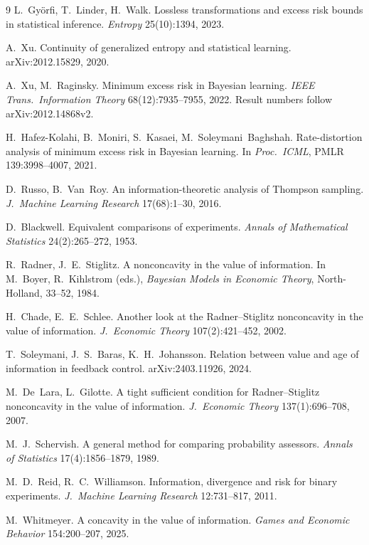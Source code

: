 \documentclass[11pt]{article}
\begin{document}
\begin{thebibliography}{9}
L.~Gy\"orfi, T.~Linder, H.~Walk. Lossless transformations and excess
risk bounds in statistical inference. \emph{Entropy} 25(10):1394, 2023.

A.~Xu. Continuity of generalized entropy and statistical learning.
arXiv:2012.15829, 2020.

A.~Xu, M.~Raginsky. Minimum excess risk in Bayesian learning.
\emph{IEEE Trans.\ Information Theory} 68(12):7935--7955, 2022.
Result numbers follow arXiv:2012.14868v2.

H.~Hafez-Kolahi, B.~Moniri, S.~Kasaei, M.~Soleymani~Baghshah.
Rate-distortion analysis of minimum excess risk in Bayesian learning.
In \emph{Proc.\ ICML}, PMLR 139:3998--4007, 2021.

D.~Russo, B.~Van~Roy. An information-theoretic analysis of Thompson
sampling. \emph{J.\ Machine Learning Research} 17(68):1--30, 2016.

D.~Blackwell. Equivalent comparisons of experiments.
\emph{Annals of Mathematical Statistics} 24(2):265--272, 1953.

R.~Radner, J.~E.~Stiglitz. A nonconcavity in the value of information. In
M.~Boyer, R.~Kihlstrom (eds.), \emph{Bayesian Models in Economic Theory},
North-Holland, 33--52, 1984.

H.~Chade, E.~E.~Schlee. Another look at the Radner--Stiglitz nonconcavity
in the value of information.
\emph{J.~Economic Theory} 107(2):421--452, 2002.

T.~Soleymani, J.~S.~Baras, K.~H.~Johansson. Relation between value and
age of information in feedback control. arXiv:2403.11926, 2024.

M.~De~Lara, L.~Gilotte. A tight sufficient condition for
Radner--Stiglitz nonconcavity in the value of information.
\emph{J.~Economic Theory} 137(1):696--708, 2007.

M.~J.~Schervish. A general method for comparing probability assessors.
\emph{Annals of Statistics} 17(4):1856--1879, 1989.

M.~D.~Reid, R.~C.~Williamson. Information, divergence and risk for binary
experiments. \emph{J.~Machine Learning Research} 12:731--817, 2011.

M.~Whitmeyer. A concavity in the value of information.
\emph{Games and Economic Behavior} 154:200--207, 2025.


\end{thebibliography}
\end{document}
